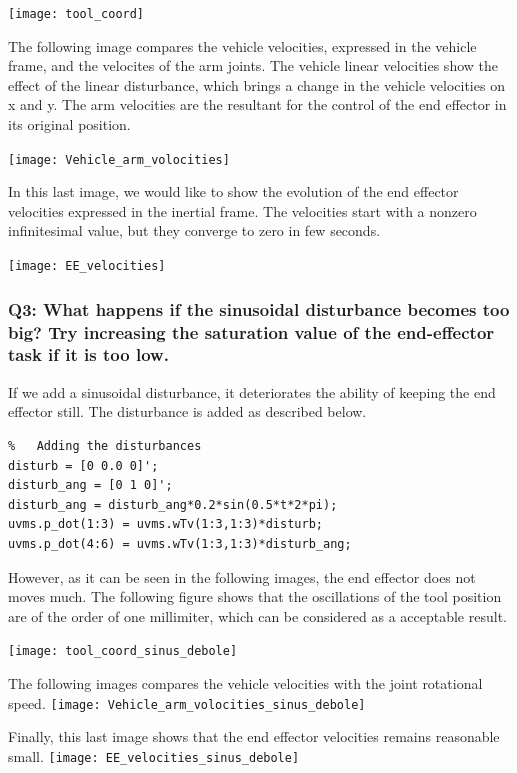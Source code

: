 \documentclass{article}
\begin{document}
\texttt{[image: tool\_coord]}
\centering

The following image compares the vehicle velocities, expressed in the vehicle frame, and the velocites of the arm joints. The vehicle linear velocities show the effect of the linear disturbance, which brings a change in the vehicle velocities on x and y. 
The arm velocities are the resultant for the control of the end effector in its original position. 

\texttt{[image: Vehicle\_arm\_volocities]}
\centering



In this last image, we would like to show the evolution of the end effector velocities expressed in the inertial frame. The velocities start with a nonzero infinitesimal value, but they converge to zero in few seconds.

\texttt{[image: EE\_velocities]}
\centering


\subsubsection{Q3: What happens if the sinusoidal disturbance becomes too big? Try increasing the saturation value of the end-effector task if it is too low.}
If we add a sinusoidal disturbance, it deteriorates the ability of keeping the end effector still. The disturbance is added as described below. 
\begin{lstlisting}
%	Adding the disturbances
disturb = [0 0.0 0]';
disturb_ang = [0 1 0]';
disturb_ang = disturb_ang*0.2*sin(0.5*t*2*pi);
uvms.p_dot(1:3) = uvms.wTv(1:3,1:3)*disturb;
uvms.p_dot(4:6) = uvms.wTv(1:3,1:3)*disturb_ang;
\end{lstlisting}
However, as it can be seen in the following images, the end effector does not moves much. 
The following figure shows that the oscillations of the tool position are of the order of one millimiter, which can be considered as a acceptable result. 

\texttt{[image: tool\_coord\_sinus\_debole]}
\centering

The following images compares the vehicle velocities with the joint rotational speed. 
\texttt{[image: Vehicle\_arm\_volocities\_sinus\_debole]}
\centering

Finally, this last image shows that the end effector velocities remains reasonable small. 
\texttt{[image: EE\_velocities\_sinus\_debole]}
\centering
 
\end{document}
